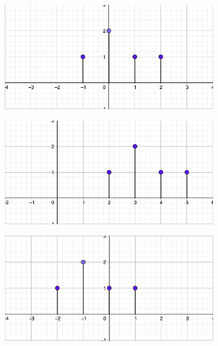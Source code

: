 \documentclass[a4paper]{book}
\begin{document}
\begin{figure}[htb]
	\centering
	\caption{Señales desplazadas}
	\begin{subfigure}[b]{0.45\textwidth}
		\includegraphics[width=\textwidth]{./Imágenes/aaa.png}
	\end{subfigure}
	\hfill
	\begin{subfigure}[b]{0.45\textwidth}
		\includegraphics[width=\textwidth]{./Imágenes/aac.png}
	\end{subfigure}

	\begin{subfigure}[b]{0.45\textwidth}
		\includegraphics[width=\textwidth]{./Imágenes/aab.png}
	\end{subfigure}
	\label{fig:señales_desplazadas}
\end{figure}
\end{document}
